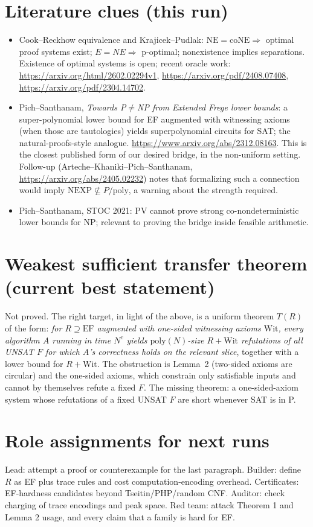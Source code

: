 \documentclass[11pt]{article}
\theoremstyle{remark}
\begin{document}
\section{Literature clues (this run)}
\begin{itemize}
\item Cook--Reckhow equivalence and Krajicek--Pudlak: $\mathrm{NE}=\mathrm{coNE}\Rightarrow$ optimal proof systems exist; $E=NE\Rightarrow$ p-optimal; nonexistence implies separations. Existence of optimal systems is open; recent oracle work: \url{https://arxiv.org/html/2602.02294v1}, \url{https://arxiv.org/pdf/2408.07408}, \url{https://arxiv.org/pdf/2304.14702}.
\item Pich--Santhanam, \emph{Towards P$\ne$NP from Extended Frege lower bounds}: a super-polynomial lower bound for EF augmented with witnessing axioms (when those are tautologies) yields superpolynomial circuits for SAT; the natural-proofs-style analogue. \url{https://www.arxiv.org/abs/2312.08163}. This is the closest published form of our desired bridge, in the non-uniform setting. Follow-up (Arteche--Khaniki--Pich--Santhanam, \url{https://arxiv.org/abs/2405.02232}) notes that formalizing such a connection would imply $\mathrm{NEXP}\not\subseteq P/\mathrm{poly}$, a warning about the strength required.
\item Pich--Santhanam, STOC 2021: PV cannot prove strong co-nondeterministic lower bounds for NP; relevant to proving the bridge inside feasible arithmetic.
\end{itemize}

\section{Weakest sufficient transfer theorem (current best statement)}
Not proved. The right target, in light of the above, is a uniform theorem $T(R)$ of the form: \emph{for $R\supseteq\mathrm{EF}$ augmented with one-sided witnessing axioms $\mathrm{Wit}$, every algorithm $A$ running in time $N^c$ yields $\mathrm{poly}(N)$-size $R+\mathrm{Wit}$ refutations of all UNSAT $F$ for which $A$'s correctness holds on the relevant slice}, together with a lower bound for $R+\mathrm{Wit}$. The obstruction is Lemma~2 (two-sided axioms are circular) and the one-sided axioms, which constrain only satisfiable inputs and cannot by themselves refute a fixed $F$. The missing theorem: a one-sided-axiom system whose refutations of a fixed UNSAT $F$ are short whenever SAT is in P.

\section{Role assignments for next runs}
Lead: attempt a proof or counterexample for the last paragraph. Builder: define $R$ as EF plus trace rules and cost computation-encoding overhead. Certificates: EF-hardness candidates beyond Tseitin/PHP/random CNF. Auditor: check charging of trace encodings and peak space. Red team: attack Theorem 1 and Lemma 2 usage, and every claim that a family is hard for EF.
\end{document}
